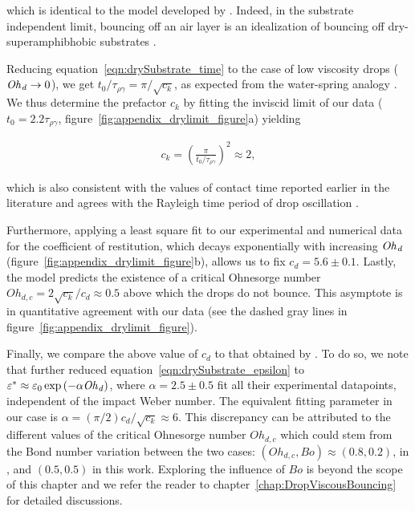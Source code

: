 \begin{subappendices}
	\noindent which is identical to the model developed by \citet{jha2020viscous}. Indeed, in the substrate independent limit, bouncing off an air layer is an idealization of bouncing off dry-superamphibhobic substrates \citep{kolinski2014drops, ramirez2020lifting, zhang2022impact}. 
	
	Reducing equation~\eqref{eqn:drySubstrate_time} to the case of low viscosity drops ($\mathit{Oh}_\mathit{d} \to 0$), we get $t_0/\tau_{\rho\gamma} = \pi/\sqrt{c_k}$, as expected from the water-spring analogy \citep{richard2002contact, okumura2003water}. We thus determine the prefactor $c_k$ by fitting the inviscid limit of our data ($t_0 = 2.2\tau_{\rho\gamma}$, figure~\ref{fig:appendix_drylimit_figure}a) yielding
	
	\begin{align}
		c_k = \left(\frac{\pi}{t_0/\tau_{\rho\gamma}}\right)^2 \approx 2,
	\end{align}
	
	\noindent which is also consistent with the values of contact time reported earlier in the literature \citep{kolinski2012skating} and agrees with the Rayleigh time period of drop oscillation \citep{rayleigh1879capillary}. 
	
	Furthermore, applying a least square fit to our experimental and numerical data for the coefficient of restitution, which decays exponentially with increasing $\mathit{Oh}_\mathit{d}$ (figure~\ref{fig:appendix_drylimit_figure}b), allows us to fix $c_d = 5.6 \pm 0.1$. Lastly, the model predicts the existence of a critical Ohnesorge number $Oh_{d,c} = 2\sqrt{c_k}/c_d \approx 0.5$ above which the drops do not bounce. This asymptote is in quantitative agreement with our data (see the dashed gray lines in figure~\ref{fig:appendix_drylimit_figure}).  
	
	Finally, we compare the above value of $c_d$ to that obtained by \citet{jha2020viscous}.
	To do so, we note that \citet{jha2020viscous} further reduced equation~\eqref{eqn:drySubstrate_epsilon} to $\varepsilon^* \approx \varepsilon_0\exp\left(-\alpha\mathit{Oh}_\mathit{d}\right)$, where $\alpha = 2.5 \pm 0.5$ fit all their experimental datapoints, independent of the impact Weber number. The equivalent fitting parameter in our case is $\alpha = (\pi/2) c_d/\sqrt{c_k} \approx 6$. This discrepancy can be attributed to the different values of the critical Ohnesorge number $Oh_{d,c}$  which could stem from the Bond number variation between the two cases: $(Oh_{d,c}, Bo) \approx (0.8, 0.2)$, in \citet{jha2020viscous}, and $(0.5, 0.5)$ in this work.  Exploring the influence of $Bo$ is beyond the scope of this chapter and we refer the reader to chapter~\ref{chap:DropViscousBouncing} for detailed discussions.
	

\end{subappendices}
